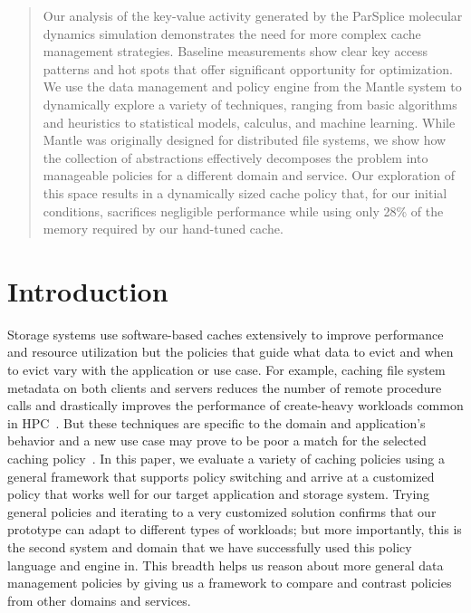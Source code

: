 \begin{abstract}

Our analysis of the key-value activity generated by the ParSplice molecular
dynamics simulation demonstrates the need for more complex cache management
strategies. Baseline measurements show clear key access patterns and hot
spots that offer significant opportunity for optimization. We use the data
management and policy engine from the Mantle system to dynamically explore a
variety of techniques, ranging from basic algorithms and heuristics to
statistical models, calculus, and machine learning. While Mantle was originally
designed for distributed file systems, we show how the collection of
abstractions effectively decomposes the problem into manageable policies for a
different domain and service.  Our exploration of this space results in a
dynamically sized cache policy that, for our initial conditions, sacrifices
negligible performance while using only 28\% of the memory required by our
hand-tuned cache.

\end{abstract}

\section{Introduction}

Storage systems use software-based caches extensively to improve performance
and resource utilization but the policies that guide what data to evict and
when to evict vary with the application or use case. For example, caching file
system metadata on both clients and servers reduces the number of remote
procedure calls and drastically improves the performance of create-heavy
workloads common in HPC~\cite{ren:sc2014-indexfs, patil:fast2011-giga+}. But
these techniques are specific to the domain and application's behavior and a
new use case may prove to be poor a match for the selected caching
policy~\cite{xiao:socc15-shardfs,brandt:msst2003-lh,sevilla:sc15-mantle,
weil:sc2004-dyn-metadata, weil:osdi2006-ceph}. In this paper, we evaluate a
variety of caching policies using a general framework that supports policy
switching and arrive at a customized policy that works well for our target
application and storage system.  Trying general policies and iterating to a
very customized solution confirms that our prototype can adapt to different
types of workloads; but more importantly, this is the second system and domain
that we have successfully used this policy language and engine in. This breadth
helps us reason about more general data management policies by giving us a
framework to compare and contrast policies from other domains and services.

